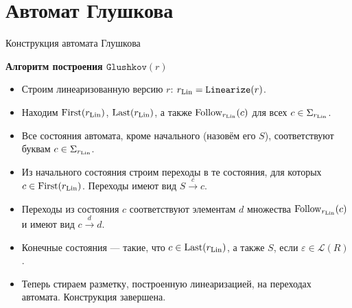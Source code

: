 \documentclass[mathserif]{beamer}
\newcommand{\Lang}{\mathscr{L}} %
\def\Linearize{\mathtt{Linearize}} %
\def\First{\mathrm{First}} %
\def\Last{\mathrm{Last}}
\def\Follow{\mathrm{Follow}}
\def\Glushkov{\mathtt{Glushkov}}
\newcommand{\empt}{\varepsilon} %
\newcommand{\rar}{\rightarrow} %
\begin{document}
\section{Автомат Глушкова}
\begin{frame}{Конструкция автомата Глушкова}
  \begin{block}{\bf Алгоритм построения $\Glushkov(r)$}
    \begin{itemize}
      \item Строим линеаризованную версию $r$: $r_{\rm Lin} =\Linearize(r)$.
      \item Находим $\First(r_{\rm Lin})$, $\Last(r_{\rm Lin})$, а также $\Follow_{r_{\rm Lin}}(c)$ для всех $c\in\Sigma_{r_{\rm Lin}}$.
      \item Все состояния автомата, кроме начального (назовём его $S$), соответствуют буквам $c\in\Sigma_{r_{\rm Lin}}$.
      \item Из начального состояния строим переходы в те состояния, для которых $c\in\First(r_{\rm Lin})$. Переходы имеют вид $S\overset{c}{\rar}{c}$.
      \item Переходы из состояния $c$ соответствуют элементам $d$ множества $\Follow_{r_{\rm Lin}}(c)$ и имеют вид $c\overset{d}{\rar}{d}$.
      \item Конечные состояния --- такие, что $c\in\Last(r_{\rm Lin})$, а также $S$, если $\empt\in\Lang(R)$.
      \item Теперь стираем разметку, построенную линеаризацией, на переходах автомата. Конструкция завершена.
    \end{itemize}
  \end{block} %
\end{frame}
\end{document}
